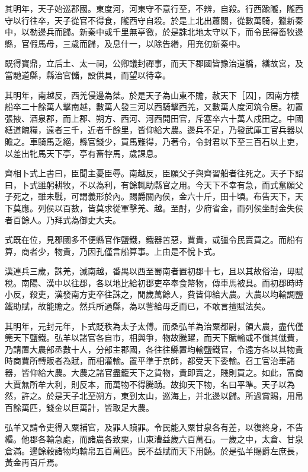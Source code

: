 其明年，天子始巡郡國。東度河，河東守不意行至，不辨，自殺。行西踰隴，隴西守以行往卒，天子從官不得食，隴西守自殺。於是上北出蕭關，從數萬騎，獵新秦中，以勒邊兵而歸。新秦中或千里無亭徼，於是誅北地太守以下，而令民得畜牧邊縣，官假馬母，三歲而歸，及息什一，以除告緡，用充仞新秦中。

既得寶鼎，立后土、太一祠，公卿議封禪事，而天下郡國皆豫治道橋，繕故宮，及當馳道縣，縣治官儲，設供具，而望以待幸。

其明年，南越反，西羌侵邊為桀。於是天子為山東不贍，赦天下［囚］，因南方樓船卒二十餘萬人擊南越，數萬人發三河以西騎擊西羌，又數萬人度河筑令居。初置張掖、酒泉郡，而上郡、朔方、西河、河西開田官，斥塞卒六十萬人戍田之。中國繕道餽糧，遠者三千，近者千餘里，皆仰給大農。邊兵不足，乃發武庫工官兵器以贍之。車騎馬乏絕，縣官錢少，買馬難得，乃著令，令封君以下至三百石以上吏，以差出牝馬天下亭，亭有畜牸馬，歲課息。

齊相卜式上書曰，臣聞主憂臣辱。南越反，臣願父子與齊習船者往死之。天子下詔曰，卜式雖躬耕牧，不以為利，有餘輒助縣官之用。今天下不幸有急，而式奮願父子死之，雖未戰，可謂義形於內。賜爵關內侯，金六十斤，田十頃。布告天下，天下莫應。列侯以百數，皆莫求從軍擊羌、越。至酎，少府省金，而列侯坐酎金失侯者百餘人。乃拜式為御史大夫。

式既在位，見郡國多不便縣官作鹽鐵，鐵器苦惡，賈貴，或彊令民賣買之。而船有算，商者少，物貴，乃因孔僅言船算事。上由是不悅卜式。

漢連兵三歲，誅羌，滅南越，番禺以西至蜀南者置初郡十七，且以其故俗治，毋賦稅。南陽、漢中以往郡，各以地比給初郡吏卒奉食幣物，傳車馬被具。而初郡時時小反，殺吏，漢發南方吏卒往誅之，閒歲萬餘人，費皆仰給大農。大農以均輸調鹽鐵助賦，故能贍之。然兵所過縣，為以訾給毋乏而已，不敢言擅賦法矣。

其明年，元封元年，卜式貶秩為太子太傅。而桑弘羊為治粟都尉，領大農，盡代僅筦天下鹽鐵。弘羊以諸官各自市，相與爭，物故騰躍，而天下賦輸或不償其僦費，乃請置大農部丞數十人，分部主郡國，各往往縣置均輸鹽鐵官，令遠方各以其物貴時商賈所轉販者為賦，而相灌輸。置平準于京師，都受天下委輸。召工官治車諸器，皆仰給大農。大農之諸官盡籠天下之貨物，貴即賣之，賤則買之。如此，富商大賈無所牟大利，則反本，而萬物不得騰踴。故抑天下物，名曰平準。天子以為然，許之。於是天子北至朔方，東到太山，巡海上，并北邊以歸。所過賞賜，用帛百餘萬匹，錢金以巨萬計，皆取足大農。

弘羊又請令吏得入粟補官，及罪人贖罪。令民能入粟甘泉各有差，以復終身，不告緡。他郡各輸急處，而諸農各致粟，山東漕益歲六百萬石。一歲之中，太倉、甘泉倉滿。邊餘穀諸物均輸帛五百萬匹。民不益賦而天下用饒。於是弘羊賜爵左庶長，黃金再百斤焉。

